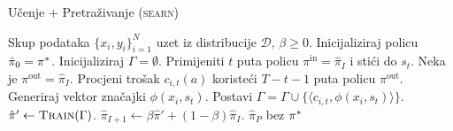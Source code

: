\begin{algorithm}
\caption{Učenje + Pretraživanje (\textsc{searn})}\label{searnalg}
\begin{algorithmic}[1]
\Require Skup podataka $\{x_i, y_i\}_{i=1}^N$ uzet iz distribucije $\mathcal{D}$,
  $\beta \geq 0$. %
\State Inicijaliziraj policu $\hat{\pi}_0 = \pi\ssymbol{1}$.
\ForAll{$I \in \big[0,1,2,\ldots,P)$}
    \State Inicijaliziraj $\Gamma = \emptyset$. 
      \State Primijeniti $t$ puta policu $\pi^{\text{in}} = \hat{\pi}_{I}$  i stići do $s_t$. 
        \State Neka je  $\pi^{\text{out}} = \hat{\pi}_{I}$.
        \State Procjeni trošak $c_{i,t}(a)$ koristeći $T-t-1$ puta policu $\pi^{\text{out}}$. 
      \EndFor
      \State Generiraj vektor značajki $\phi(x_i, s_t)$.
      \State Postavi $\Gamma = \Gamma \cup \{\langle c_{i,t}, \phi(x_i, s_t) \rangle\}$.
    \EndFor
  \EndFor
  \State $\hat{\pi}' \gets \textsc{Train}(\Gamma)$.
  \State $\hat{\pi}_{I+1} \gets \beta \hat{\pi}' + (1-\beta) \hat{\pi}_{I}$.
\EndFor
\State \Return $\hat{\pi}_{P}$ bez $\pi\ssymbol{1}$
\end{algorithmic}
\end{algorithm}
